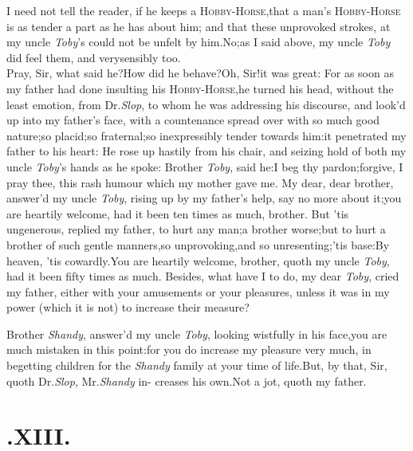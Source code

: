 \documentclass{article}
\begin{document}
I need not tell the reader, if he keeps a
\textsc{Hobby-Horse},\tsk that a man’s
\textsc{Hobby-Horse} is as tender a part as he
has\break
about him; and that these unprovoked strokes, at my uncle
\textit{Toby}’s could not be unfelt by
him.\tsk No;\tsk as I said above, my uncle
\textit{Toby} did feel them, and very\break sensibly too.\\
\newpage
Pray, Sir, what said he?\tsk How did\break
he behave?\tsk Oh, Sir!\tsk it was great:\break 
For as soon as my father had done in\-sulting his
\textsc{Hobby-Horse},\tsh he turned
his head, without the least emotion,\break
from Dr.\@ \textit{Slop}, to whom he was addres\-sing his discourse, and look’d up into my
father’s face, with a countenance spread over with so much
good nature;\tsh so placid;\tsk so
fraternal;\tsk so inexpressibly tender towards
him:\tsk it penetrated my father to his heart: He rose up hastily
from his chair, and seizing hold of both my uncle
\textit{Toby}’s hands as he spoke:\tsh\break
Brother \textit{Toby}, said he:\tsk I beg thy pardon;\tsk forgive, I pray thee,
this rash humour which my mother gave me.\tsk\break
My dear, dear brother, answer’d my uncle \textit{Toby}, rising up by my
father’s help, say no more about it;\tsk you are heartily
welcome, had it been ten times as much,
brother. But ’tis
ungenerous, replied my father, to hurt any man;\tsh a
brother worse;\tsk but to hurt a brother of such gentle
manners,\tsk so unprovoking,\tsk and so
unresenting;\tsk ’tis base:\tsk By heaven,
’tis cowardly.\tsh You are heartily welcome, brother, quoth
my uncle \textit{Toby},\tsk\break
had it been fifty times as much.\tsh\break
Besides, what have I to do, my
dear \textit{Toby}, cried my father, either with your amusements or
your pleasures, unless it was in my power (which it is not) to
increase\break
their measure?

\tsk Brother \textit{Shandy}, answer’d my uncle
\textit{Toby}, looking wistfully in his face,\tsk you are
much mistaken in this point:\tsk for you do increase my pleasure
very much, in begetting children for the \textit{Shandy} family at
your time of life.\tsh But, by that, Sir, quoth Dr.\@ \textit{Slop},
Mr.\@ \textit{Shandy} in-
creases his own.\tsh Not a jot, quoth\break
my father.


\null
\section{.\enspace  XIII.}
\end{document}

